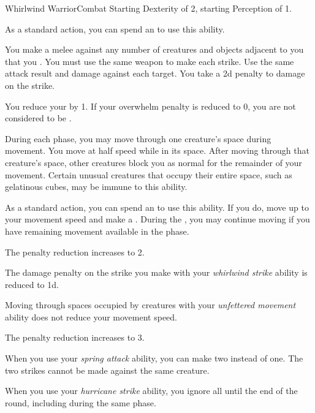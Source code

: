     \begin{feat}{Whirlwind Warrior}{Combat}
        \featpres Starting Dexterity of 2, starting Perception of 1.
        \featben

         As a standard action, you can spend an  to use this ability.
        \begin{ability}
            \begin{spelleffects}
                \spelleffect You make a melee  against any number of creatures and objects adjacent to you that you .
                You must use the same weapon to make each strike.
                Use the same attack result and damage against each target.
                You take a \minus2d penalty to damage on the strike.
            \end{spelleffects}
        \end{ability}

         You reduce your  by 1.
        If your overwhelm penalty is reduced to 0, you are not considered to be .

         During each phase, you may move through one creature's space during movement.
        You move at half speed while in its space.
        After moving through that creature's space, other creatures block you as normal for the remainder of your movement.
        Certain unusual creatures that occupy their entire space, such as gelatinous cubes, may be immune to this ability.

         As a standard action, you can spend an  to use this ability.
        If you do, move up to your movement speed and make a .
        During the , you may continue moving if you have remaining movement available in the phase.

         The penalty reduction increases to 2.

         The damage penalty on the strike you make with your \textit{whirlwind strike} ability is reduced to \minus1d.

         Moving through spaces occupied by creatures with your \textit{unfettered movement} ability does not reduce your movement speed.

         The penalty reduction increases to 3.

         When you use your \textit{spring attack} ability, you can make two  instead of one.
        The two strikes cannot be made against the same creature.

         When you use your \textit{hurricane strike} ability, you ignore all  until the end of the round, including during the same phase.
    \end{feat}


